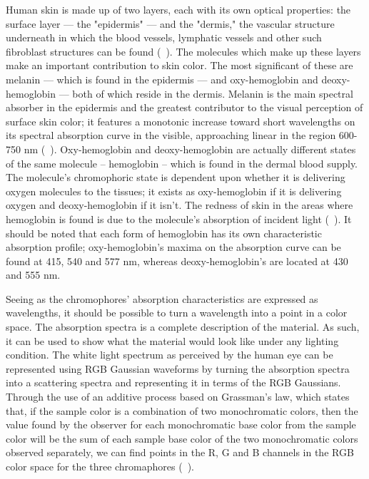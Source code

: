 Human skin is made up of two layers, each with its own optical properties: the surface layer --- the "epidermis" --- and the "dermis," the vascular structure underneath in which the blood vessels, lymphatic vessels and other such fibroblast structures can be found (~\cite{Stamatas2004}). The molecules which make up these layers make an important contribution to skin color. The most significant of these are melanin --- which is found in the epidermis --- and oxy-hemoglobin and deoxy-hemoglobin --- both of which reside in the dermis. Melanin is the main spectral absorber in the epidermis and the greatest contributor to the visual perception of surface skin color; it features a monotonic increase toward short wavelengths on its spectral absorption curve in the visible, approaching linear in the region 600-750 nm (~\cite{Stamatas2004,Kollias1995}). Oxy-hemoglobin and deoxy-hemoglobin are actually different states of the same molecule -- hemoglobin -- which is found in the dermal blood supply. The molecule's chromophoric state is dependent upon whether it is delivering oxygen molecules to the tissues; it exists as oxy-hemoglobin if it is delivering oxygen and deoxy-hemoglobin if it isn't. The redness of skin in the areas where hemoglobin is found is due to the molecule's absorption of incident light (~\cite{Kollias1995}). It should be noted that each form of hemoglobin has its own characteristic absorption profile; oxy-hemoglobin's maxima on the absorption curve can be found at 415, 540 and 577 nm, whereas deoxy-hemoglobin's are located at 430 and 555 nm.

Seeing as the chromophores' absorption characteristics are expressed as wavelengths, it should be possible to turn a wavelength into a point in a color space. The absorption spectra is a complete description of the material. As such, it can be used to show what the material would look like under any lighting condition. The white light spectrum as perceived by the human eye can be represented using RGB Gaussian waveforms by turning the absorption spectra into a scattering spectra and representing it in terms of the RGB Gaussians. Through the use of an additive process based on Grassman's law, which states that, if the sample color is a combination of two monochromatic colors, then the value found by the observer for each monochromatic base color from the sample color will be the sum of each sample base color of the two monochromatic colors observed separately, we can find points in the R, G and B channels in the RGB color space for the three chromaphores (~\cite{MIHAI2007}).

